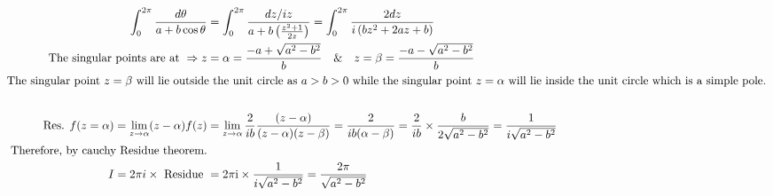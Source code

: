 \begin{answer}
	\begin{align*}
	\int_{0}^{2 \pi} \frac{d \theta}{a+b \cos \theta}&=\int_{0}^{2 \pi} \frac{d z / i z}{a+b\left(\frac{z^{2}+1}{2 z}\right)}=\int_{0}^{2 \pi} \frac{2 d z}{i\left(b z^{2}+2 a z+b\right)}\\
	\text { The singular points are at } \Rightarrow z&=\alpha=\frac{-a+\sqrt{a^{2}-b^{2}}}{b} \quad \& \quad z=\beta=\frac{-a-\sqrt{a^{2}-b^{2}}}{b}\\
	\intertext{The singular point $z=\beta$ will lie outside the unit circle as $a>b>0$ while the singular point $z=\alpha$ will lie inside the unit circle which is a simple pole.}\\
	\text { Res. } f(z=\alpha)=\lim _{z \rightarrow \alpha}(z-\alpha) f(z)&=\lim _{z \rightarrow \alpha} \frac{2}{i b} \frac{(z-\alpha)}{(z-\alpha)(z-\beta)}=\frac{2}{i b(\alpha-\beta)}=\frac{2}{i b} \times \frac{b}{2 \sqrt{a^{2}-b^{2}}}=\frac{1}{i \sqrt{a^{2}-b^{2}}}\\
\text { Therefore,  }\text{by cauchy Residue theorem.}&\\
I=2 \pi i \times \text { Residue }&=2 \pi \mathrm{i} \times \frac{1}{i \sqrt{a^{2}-b^{2}}}=\frac{2 \pi}{\sqrt{a^{2}-b^{2}}}
	\end{align*}
\end{answer}


